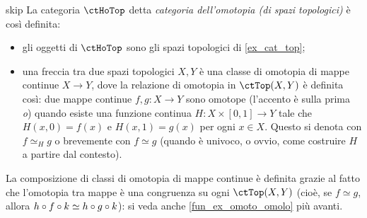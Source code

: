 \begin{hExample}{skip}\label{ex_cat_hotop}
	La categoria \(\ctHoTop\) detta \emph{categoria dell'omotopia (di spazi topologici)} è così definita:
	\begin{itemize}
		\item gli oggetti di \(\ctHoTop\) sono gli spazi topologici di \ref{ex_cat_top};
		\item una freccia tra due spazi topologici \(X,Y\) è una classe di omotopia di mappe continue \(X\to Y\), dove la relazione di omotopia in \(\ctTop(X,Y)\) è definita così: due mappe continue \(f,g : X\to Y\) sono omotope (l'accento è sulla prima \emph{o}) quando esiste una funzione continua \(H : X \times [0,1] \to Y\) tale che \(H(x,0) = f(x)\) e \(H(x,1)=g(x)\) per ogni \(x\in X\). Questo si denota con \(f\simeq_H g\) o brevemente con \(f\simeq g\) (quando è univoco, o ovvio, come costruire \(H\) a partire dal contesto).
	\end{itemize}
	La composizione di classi di omotopia di mappe continue è definita grazie al fatto che l'omotopia tra mappe è una congruenza su ogni \(\ctTop(X,Y)\) (cioè, se \(f\simeq g\), allora \(h\circ f\circ k\simeq h\circ g\circ k\)): si veda anche \ref{fun_ex_omoto_omolo} più avanti.
\end{hExample}
